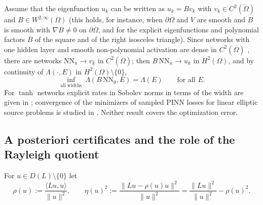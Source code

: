 \begin{remark}\label{rem.approx}
Assume that the eigenfunction $u_k$ can be written as $u_k=Bv_k$ with
$v_k\in C^2(\overline\Omega)$ and $B\in W^{2,\infty}(\Omega)$ (this holds, for instance,
when $\partial\Omega$ and $V$ are smooth and $B$ is smooth with $\nabla B\neq0$ on
$\partial\Omega$, and for the explicit eigenfunctions and polynomial factors $B$ of the
square and of the right isosceles triangle). Since networks with one hidden layer and
smooth non-polynomial activation are dense in $C^2(\overline\Omega)$
\cite{Hornik1991,Pinkus1999}, there are networks $\mathrm{NN}_n\to v_k$ in
$C^2(\overline\Omega)$; then $B\,\mathrm{NN}_n\to u_k$ in $H^2(\Omega)$, and by continuity
of $\Lambda(\cdot,E)$ in $H^2(\Omega)\setminus\{0\}$,
\[
\inf_{\text{all widths}}\ \Lambda(B\,\mathrm{NN}_\theta,E)=\Lambda(E)\qquad\text{for all }E .
\]
For $\tanh$ networks explicit rates in Sobolev norms in terms of the width are given in
\cite{DeRyck-Lanthaler-Mishra}; convergence of the minimizers of sampled PINN losses for
linear elliptic source problems is studied in \cite{Shin-Darbon-Karniadakis}. Neither
result covers the optimization error.
\end{remark}



\subsection*{A posteriori certificates and the role of the Rayleigh quotient}

For $u\in D(L)\setminus\{0\}$ let
\[
\rho(u):=\frac{\langle Lu,u\rangle}{\|u\|^2},\qquad
\eta(u)^2:=\frac{\|Lu-\rho(u)u\|^2}{\|u\|^2}=\frac{\|Lu\|^2}{\|u\|^2}-\rho(u)^2 .
\]

